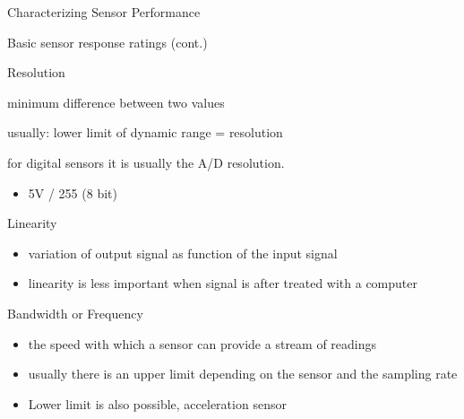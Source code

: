 \documentclass[compress]{beamer}
\providecommand{\tightlist}{%
  \setlength{\itemsep}{0pt}\setlength{\parskip}{0pt}}
\begin{document}
\begin{frame}{Characterizing Sensor Performance}

Basic sensor response ratings (cont.)

Resolution

minimum difference between two values

usually: lower limit of dynamic range = resolution

for digital sensors it is usually the A/D resolution.

\begin{itemize}
\tightlist
\item
  \eg 5V / 255 (8 bit)
\end{itemize}

Linearity

\begin{itemize}
\tightlist
\item
  variation of output signal as function of the input signal
\item
  linearity is less important when signal is after treated with a
  computer
\end{itemize}

Bandwidth or Frequency

\begin{itemize}
\tightlist
\item
  the speed with which a sensor can provide a stream of readings
\item
  usually there is an upper limit depending on the sensor and the
  sampling rate
\item
  Lower limit is also possible, \eg acceleration sensor
\end{itemize}

\end{frame}
\end{document}
